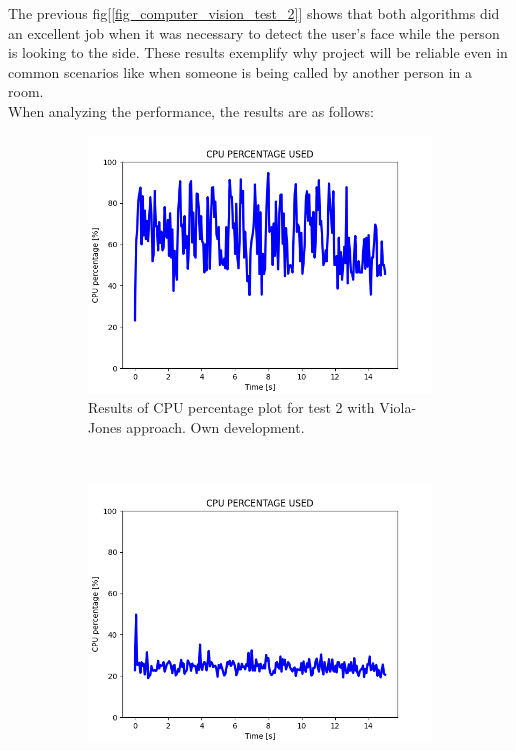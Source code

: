 \documentclass[11pt]{report} %
\begin{document}
The previous fig[\ref{fig_computer_vision_test_2}] shows that both algorithms did an excellent job when it was necessary to detect the user's face while the person is looking to the side. These results exemplify why  project will be reliable even in common scenarios like when someone is being called by another person in a room.\\

When analyzing the performance, the results are as follows:

\begin{figure}[H]
	\centering
	\begin{subfigure}{.5\textwidth}
		\centering
		\includegraphics[width=1.0\linewidth]{assets/imgs/computer_vision/face_detection_ex_2_hc_cpu.png}
		\caption{Results of CPU percentage plot for test 2 with Viola-Jones approach. Own development.}
		\label{fig_computer_vision_test_2_cpu_a}
	\end{subfigure}~
	\begin{subfigure}{.5\textwidth}
		\centering
		\includegraphics[width=1.0\linewidth]{assets/imgs/computer_vision/face_detection_ex_2_fr_cpu.png}

\end{subfigure}
\end{figure}
\end{document}
